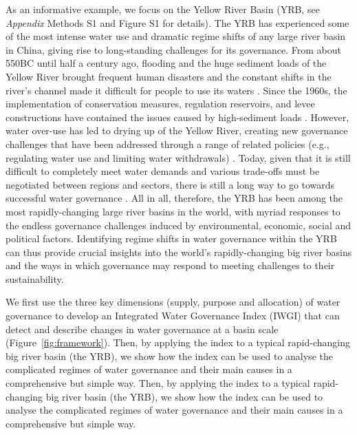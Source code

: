 \documentclass[9pt, twocolumn, twoside, lineno]{pnas-new}
\begin{document}
\label{introduction-section-3}
As an informative example, we focus on the Yellow River Basin (YRB, see \textit{Appendix} Methods S1 and Figure S1 for details). 
The YRB has experienced some of the most intense water use and dramatic regime shifts of any large river basin in China, giving rise to long-standing challenges for its governance.
From about 550BC until half a century ago, flooding and the huge sediment loads of the Yellow River brought frequent human disasters and the constant shifts in the river’s channel made it difficult for people to use its waters 
\cite{song2020,li2020}. 
Since the 1960s, the implementation of conservation measures, regulation reservoirs, and levee constructions have contained the issues caused by high-sediment loads
\cite{wang2016,wu2020}.
However, water over-use has led to drying up of the Yellow River, creating new governance challenges that have been addressed through a range of related policies (e.g., regulating water use and limiting water withdrawals) 
\cite{xia2012}.
Today, given that it is still difficult to completely meet water demands and various trade-offs must be negotiated between regions and sectors, there is still a long way to go towards successful water governance 
\cite{wang2019, wohlfart2016}.
All in all, therefore, the YRB has been among the most rapidly-changing large river basins in the world, with myriad responses to the endless governance challenges induced by environmental, economic, social and political factors. 
Identifying regime shifts in water governance within the YRB can thus provide crucial insights into the world’s rapidly-changing big river basins and the ways in which governance may respond to meeting challenges to their sustainability.

\label{introduction-section-3}
We first use the three key dimensions (supply, purpose and allocation) of water governance to develop an Integrated Water Governance Index (IWGI) that can detect and describe changes in water governance at a basin scale (Figure~\ref{fig:framework}).
Then, by applying the index to a typical rapid-changing big river basin (the YRB), we show how the index can be used to analyse the complicated regimes of water governance and their main causes in a comprehensive but simple way. 
Then, by applying the index to a typical rapid-changing big river basin (the YRB), we show how the index can be used to analyse the complicated regimes of water governance and their main causes in a comprehensive but simple way. 
\end{document}
